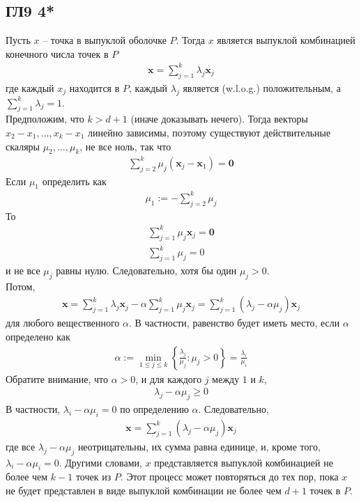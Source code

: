 \subsection*{ГЛ9 4*}
Пусть $x$ -- точка в выпуклой оболочке $P$. Тогда $x$ является выпуклой комбинацией конечного числа точек в $P$
\begin{gather*}
	\mathbf{x}=\sum\limits_{j=1}^k \lambda_j \mathbf{x}_j
\end{gather*}
где каждый $x_{j}$ находится в $P$, каждый $\lambda_{j}$ является (w.l.o.g.) положительным, а $\sum\limits_{j = 1}^k\lambda_j = 1$. \\
Предположим, что $k > d+1$ (иначе доказывать нечего). Тогда векторы $x_{2} - x_{1}, \ldots, x_{k} - x_{1}$ линейно зависимы, поэтому существуют действительные скаляры $\mu_{2}, \ldots, \mu_{k}$, не все ноль, так что
\begin{gather*}
	\sum\limits_{j=2}^k \mu_j (\mathbf{x}_j-\mathbf{x}_1)=\mathbf{0}
\end{gather*}
Если $\mu_{1}$ определить как
\begin{gather*}
	\mu_1:= -\sum\limits_{j=2}^k \mu_j
\end{gather*}
То
\begin{gather*}
	\sum\limits_{j=1}^k \mu_j \mathbf{x}_j=\mathbf{0}\\
	\sum\limits_{j=1}^k \mu_j=0
\end{gather*}		
и не все $\mu_{j}$ равны нулю. Следовательно, хотя бы один $\mu_{j} > 0$.\\
Потом,
\begin{gather*}
	\mathbf{x} = \sum\limits_{j=1}^k \lambda_j \mathbf{x}_j-\alpha\sum\limits_{j=1}^k \mu_j \mathbf{x}_j = \sum\limits_{j=1}^k (\lambda_j-\alpha\mu_j) \mathbf{x}_j
\end{gather*}
для любого вещественного $\alpha$. В частности, равенство будет иметь место, если $\alpha$ определено как
\begin{gather*}
	\alpha:=\min_{1\leq j \leq k} \left\{ \tfrac{\lambda_j}{\mu_j}:\mu_j>0\right\}=\tfrac{\lambda_i}{\mu_i}
\end{gather*}
Обратите внимание, что $\alpha > 0$, и для каждого $j$ между $1$ и $k$,
\begin{gather*}
	\lambda_j-\alpha\mu_j \geq 0
\end{gather*}
В частности, $\lambda_{i} - \alpha\mu_{i} = 0$ по определению $\alpha$. Следовательно,
\begin{gather*}
	\mathbf{x} = \sum\limits_{j=1}^k (\lambda_j-\alpha\mu_j) \mathbf{x}_j
\end{gather*}
где все $\lambda_{j} - \alpha\mu_{j}$ неотрицательны, их сумма равна единице, и, кроме того, $\lambda_i - \alpha\mu_i = 0$. Другими словами, $x$ представляется выпуклой комбинацией не более чем $k-1$ точек из $P$. Этот процесс может повторяться до тех пор, пока $x$ не будет представлен в виде выпуклой комбинации не более чем $d + 1$ точек в $P$.
